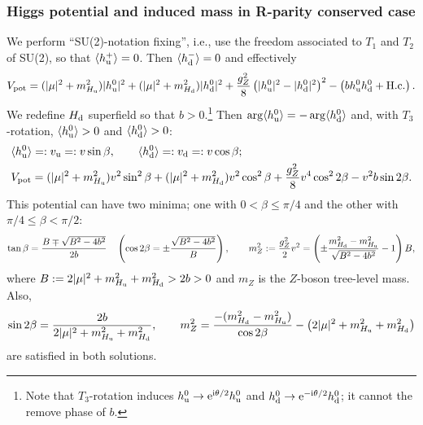 \documentclass[CheatSheet]{subfiles}
\begin{document}
\subsubsection{Higgs potential and induced mass in  R-parity conserved case}
We perform ``SU(2)-notation fixing'', i.e., use the freedom associated to $T_1$ and $T_2$ of SU(2), so that $\langle h_{\mathrm{u}}^+\rangle=0$. Then $\langle h_{\mathrm{d}}^-\rangle=0$ and effectively
\begin{equation}
 V_{\mathrm{pot}}=
   (|\mu|^2 + m^2_{H_{\mathrm{u}}})  |h_{\mathrm{u}}^0|^2
 + (|\mu|^2 + m^2_{H_{\mathrm{d}}}) |h_{\mathrm{d}}^0|^2
 + \frac{g_Z^2}{8}\left(|h_{\mathrm{u}}^0|^2 - |h_{\mathrm{d}}^0|^2\right)^2
 - \left(bh_{\mathrm{u}}^0h_{\mathrm{d}}^0 +\text{H.c.}\right).
\end{equation}
We redefine $H_{\mathrm{d}}$ superfield so that $b>0$.\footnote{
Note that $T_3$-rotation induces $h_{\mathrm{u}}^0\to\mathop{}\!\mathrm{e}^{\mathrm{i}\theta/2}h_{\mathrm{u}}^0$ and $h_{\mathrm{d}}^0\to\mathop{}\!\mathrm{e}^{-\mathrm{i}\theta/2}h_{\mathrm{d}}^0$; it cannot the remove phase of $b$.}
Then $\arg\langle h_{\mathrm{u}}^0\rangle=-\arg\langle h_{\mathrm{d}}^0\rangle$ and, with $T_3$-rotation, $\langle h_{\mathrm{u}}^0\rangle>0$ and $\langle h_{\mathrm{d}}^0\rangle>0$:
\begin{align}
 &\langle h_{\mathrm{u}}^0\rangle =: v_{\mathrm{u}} =: v\sin\beta,\qquad
 \langle h_{\mathrm{d}}^0\rangle =: v_{\mathrm{d}} =: v\cos\beta;
\\
& V_{\mathrm{pot}}=
   (|\mu|^2 + m^2_{H_{\mathrm{u}}})  v^2\sin^2\beta
 + (|\mu|^2 + m^2_{H_{\mathrm{d}}}) v^2\cos^2\beta
 + \frac{g_Z^2}{8}v^4\cos^2 2\beta
 - v^2 b\sin2\beta.
\end{align}
This potential can have two minima; one with $0<\beta\le\pi/4$ and the other with $\pi/4\le\beta<\pi/2$:
\begin{equation}
 \tan\beta = \frac{B\mp\sqrt{B^2-4b^2}}{2b}
\quad
\left(\cos2\beta = \pm\frac{\sqrt{B^2-4b^2}}{B}\right),
 \qquad
 m_Z^2:=\frac{g_Z^2}{2}v^2 = \left(\pm\frac{m_{H_{\mathrm{d}}}^2 - m_{H_{\mathrm{u}}}^2}{\sqrt{B^2-4b^2}}-1\right)B,
\end{equation}
where $B:=2|\mu|^2+m_{H_{\mathrm{u}}}^2+m_{H_{\mathrm{d}}}^2>2b>0$ and $m_Z$ is the $Z$-boson tree-level mass.
Also,
\begin{equation}
 \sin2\beta = \frac{2b}{2|\mu|^2 + m_{H_{\mathrm{u}}}^2 + m_{H_{\mathrm{d}}}^2},
\qquad
 m_Z^2 = \frac{-(m_{H_{\mathrm{d}}}^2 - m_{H_{\mathrm{u}}}^2)}{\cos2\beta} - \left(2|\mu|^2 + m_{H_{\mathrm{u}}}^2 + m_{H_{\mathrm{d}}}^2\right)
\end{equation}
are satisfied in both solutions.
\end{document}
